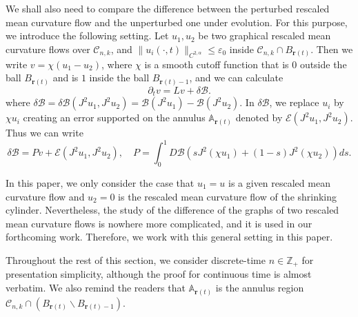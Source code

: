 \documentclass[11pt]{amsart}
\numberwithin{equation}{section}
\numberwithin{equation}{section}
\newcommand{\eps}{\varepsilon}
\newcommand{\br}{\mathbf{r}}
\newcommand{\cB}{\mathcal{B}}
\newcommand{\cC}{\mathcal{C}}
\newcommand{\pr}{\partial}
\begin{document}
	We shall also need to compare the difference between the perturbed rescaled mean curvature flow and the unperturbed one under evolution. For this purpose, we introduce the following setting. Let $u_1,u_2$ be two graphical rescaled mean curvature flows over $\cC_{n,k}$, and $\|u_i(\cdot,t)\|_{C^{2,\alpha}}\leq \eps_0$ inside $\cC_{n,k}\cap B_{\br(t)}$. Then we write $v=\chi(u_1-u_2)$, where $\chi$ is a smooth cutoff function that is 0 outside the ball $B_{\br(t)}$ and is $1$ inside the ball $B_{\br(t)-1}$, and we can calculate
	\begin{equation}\label{EqDifference}
		\pr_t v=L v+\delta\cB. 
	\end{equation}
	where $\delta\cB=\delta\cB(J^2u_1,J^2u_2)=\cB(J^2u_1)-\cB(J^2u_2)$. In $\delta\cB$, we replace $u_i$ by $\chi u_i$ creating an error supported on the annulus $\mathbb A_{\br(t)}$ denoted by $\mathcal E(J^2u_1,J^2u_2). $ Thus we can write 
	\begin{equation}\label{EqPE}
		\delta\cB =P v+\mathcal E(J^2u_1,J^2u_2), \quad P = \int_0^1 D \cB(sJ^2(\chi u_1)+(1-s)J^2(\chi u_2))ds.		
	\end{equation}
	
	In this paper, we only consider the case that $u_1=u$ is a given rescaled mean curvature flow and $u_2=0$ is the rescaled mean curvature flow of the shrinking cylinder. Nevertheless, the study of the difference of the graphs of two rescaled mean curvature flows is nowhere more complicated, and it is used in our forthcoming work. Therefore, we work with this general setting in this paper.
	
	Throughout the rest of this section, we consider discrete-time $n\in\mathbb Z_{+}$ for presentation simplicity, although the proof for continuous time is almost verbatim. We also remind the readers that $\mathbb A_{\mathbf r(t)}$ is the annulus region $\cC_{n,k}\cap(B_{\br(t)}\backslash B_{\br(t)-1})$.
	
\end{document}

